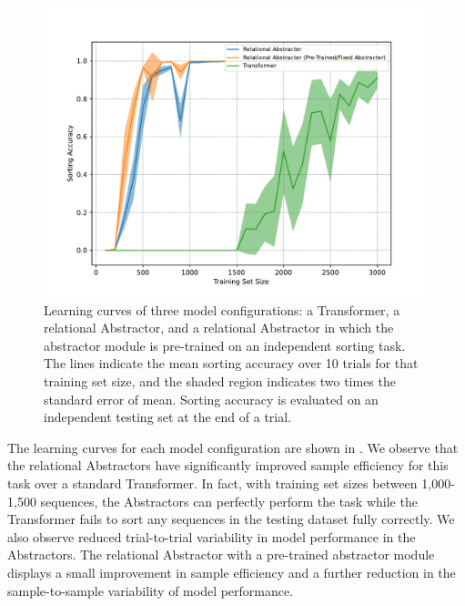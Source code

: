 \begin{figure}[t!]
	\centering
	\includegraphics[width=.8\textwidth]{figures/random_object_argsort_learning_curves.pdf}
	\caption{Learning curves of three model configurations: a Transformer, a relational Abstractor, and a relational Abstractor in which the abstractor module is pre-trained on an independent sorting task. The lines indicate the mean sorting accuracy over 10 trials for that training set size, and the shaded region indicates two times the standard error of mean. Sorting accuracy is evaluated on an independent testing set at the end of a trial.}
	\label{fig:random_object_argsort_learning_curves}
\end{figure}


The learning curves for each model configuration are shown in . We observe that the relational Abstractors have significantly improved sample efficiency for this task over a standard Transformer. In fact, with training set sizes between 1,000-1,500 sequences, the Abstractors can perfectly perform the task while the Transformer fails to sort any sequences in the testing dataset fully correctly. We also observe reduced trial-to-trial variability in model performance in the Abstractors.
The relational Abstractor with a pre-trained abstractor module displays a small improvement in sample efficiency and a further reduction in the sample-to-sample variability of model performance.

